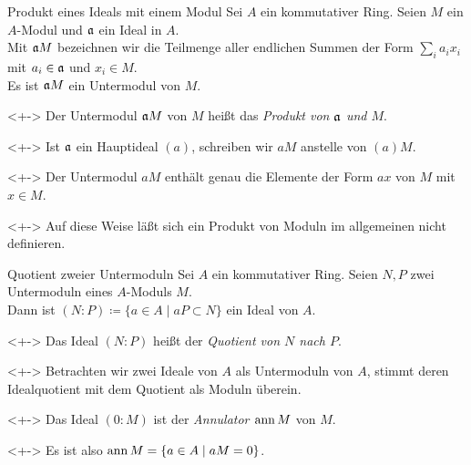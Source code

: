 \begin{frame}{Produkt eines Ideals mit einem Modul}
	Sei \(A\) ein kommutativer Ring. Seien \(M\) ein \(A\)-Modul und \(\mathfrak{a}\) ein Ideal in \(A\).
	\\
	Mit \(\mathfrak{a} M\) bezeichnen wir die Teilmenge aller endlichen Summen der Form \(\sum\limits_i
	a_i x_i\) mit \(a_i \in \mathfrak{a}\) und \(x_i \in M\).
	\\
	Es ist \(\mathfrak{a} M\) ein Untermodul von \(M\).
	\begin{definition}<+->
		Der Untermodul \(\mathfrak{a} M\) von \(M\) heißt das \emph{Produkt von \(\mathfrak{a}\) und \(M\)}.
	\end{definition}
	\begin{notation}<+->
		Ist \(\mathfrak{a}\) ein Hauptideal \((a)\), schreiben wir \(a M\) anstelle von \((a) M\).
	\end{notation}
	\begin{visibleenv}<+->
		Der Untermodul \(a M\) enthält genau die Elemente der Form \(a x\) von \(M\) mit \(x \in M\).
	\end{visibleenv}
	\begin{remark}<+->
		Auf diese Weise läßt sich ein Produkt von Moduln im allgemeinen nicht definieren.
	\end{remark}
\end{frame}

\begin{frame}{Quotient zweier Untermoduln}
	Sei \(A\) ein kommutativer Ring. Seien \(N, P\) zwei Untermoduln eines \(A\)-Moduls \(M\).
	\\
	Dann ist \((N : P) \coloneqq \{a \in A \mid a P \subset N\}\) ein Ideal von \(A\).
	\begin{definition}<+->
		Das Ideal \((N : P)\) heißt der \emph{Quotient von \(N\) nach \(P\)}.
	\end{definition}
	\begin{remark}<+->
		Betrachten wir zwei Ideale von \(A\) als Untermoduln von \(A\), stimmt deren Idealquotient mit dem
		Quotient als Moduln überein.
	\end{remark}
	\begin{definition}<+->
		Das Ideal \((0:M)\) ist der \emph{Annulator \(\operatorname{ann} M\)} von \(M\).
	\end{definition}
	\begin{visibleenv}<+->
		Es ist also \(\operatorname{ann} M = \{a \in A \mid a M = 0\}\).
	\end{visibleenv}
\end{frame}

